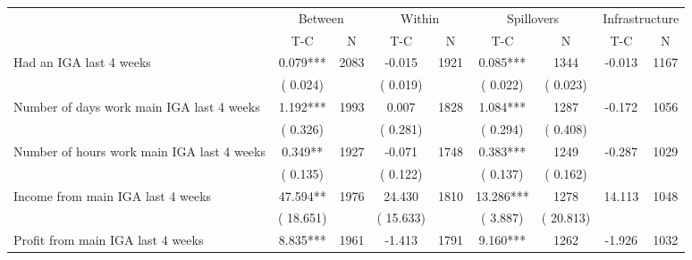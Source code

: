 
\begin{tabular}{l*{8}{c}}\hline&\multicolumn{2}{c}{Between}&\multicolumn{2}{c}{Within}&\multicolumn{2}{c}{Spillovers}&\multicolumn{2}{c}{Infrastructure}\\ \cmidrule(r){2-3}\cmidrule(l){4-5}\cmidrule(l){6-7}\cmidrule(l){8-9} & {T-C} & {N} & {T-C} & {N}  & {T-C}  & {N} & {T-C}  & {N} \\ \midrule
Had an IGA last 4 weeks        &              0.079***      &       2083       &             -0.015      &       1921       &              0.085***      &       1344  &       -0.013 &       1167       \\
                       &       (       0.024)            &                               &       (       0.019)            &                               &       (       0.022)            &       (       0.023) &                  \\
Number of days work main IGA last 4 weeks        &              1.192***      &       1993       &              0.007      &       1828       &              1.084***      &       1287  &       -0.172 &       1056       \\
                       &       (       0.326)            &                               &       (       0.281)            &                               &       (       0.294)            &       (       0.408) &                  \\
Number of hours work main IGA last 4 weeks        &              0.349**      &       1927       &             -0.071      &       1748       &              0.383***      &       1249  &       -0.287 &       1029       \\
                       &       (       0.135)            &                               &       (       0.122)            &                               &       (       0.137)            &       (       0.162) &                  \\
Income from main IGA last 4 weeks        &             47.594**      &       1976       &             24.430      &       1810       &             13.286***      &       1278  &       14.113 &       1048       \\
                       &       (      18.651)            &                               &       (      15.633)            &                               &       (       3.887)            &       (      20.813) &                  \\
Profit from main IGA last 4 weeks        &              8.835***      &       1961       &             -1.413      &       1791       &              9.160***      &       1262  &       -1.926 &       1032       \\

\end{tabular}
